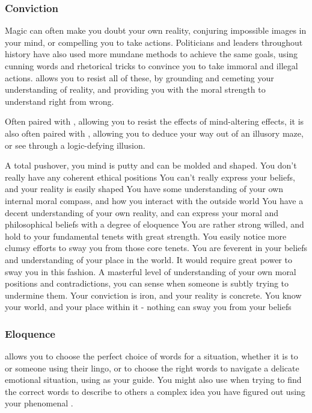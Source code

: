 \subsubsection{Conviction}

Magic can often make you doubt your own reality, conjuring impossible images in your mind, or compelling you to take actions. Politicians and leaders throughout history have also used more mundane methods to achieve the same goals, using cunning words and rhetorical tricks to convince you to take immoral and illegal actions.  allows you to resist all of these, by grounding and cemeting your understanding of reality, and providing you with the moral strength to understand right from wrong. 

Often paired with , allowing you to resist the effects of mind-altering effects, it is also often paired with , allowing you to deduce your way out of an illusory maze, or see through a logic-defying illusion.  

\ratingTable
{A total pushover, you mind is putty and can be molded and shaped. You don't really have any coherent ethical positions}
{You can't really express your beliefs, and your reality is easily shaped}
{You have some understanding of your own internal moral compass, and how you interact with the outside world}
{You have a decent understanding of your own reality, and can express your moral and philosophical beliefs with a degree of eloquence}
{You are rather strong willed, and hold to your fundamental tenets with great strength. You easily notice more clumsy efforts to sway you from those core tenets.}
{You are feverent in your beliefs and understanding of your place in the world. It would require great power to sway you in this fashion.}
{A masterful level of understanding of your own moral positions and contradictions, you can sense when someone is subtly trying to undermine them.}
{Your conviction is iron, and your reality is concrete. You know your world, and your place within it - nothing can sway you from your beliefs}


\subsubsection{Eloquence}
 allows you to choose the perfect choice of words for a situation, whether it is to  or  someone using their lingo, or to choose the right words to navigate a delicate emotional situation, using  as your guide. You might also use  when trying to find the correct words to describe to others a complex idea you have figured out using your phenomenal .


